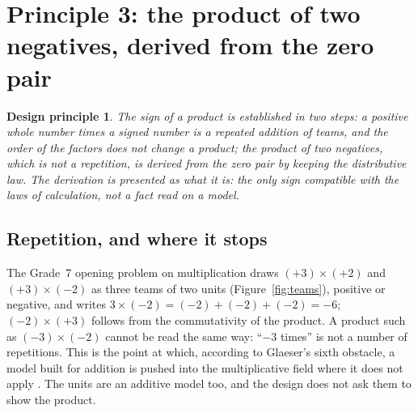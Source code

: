\documentclass[11pt,a4paper]{article}
\newtheorem{principle}{Design principle}
\theoremstyle{definition}
\begin{document}
\section{Principle 3: the product of two negatives, derived from the zero pair}\label{sec:p3}

\begin{principle}
The sign of a product is established in two steps: a positive whole number times a signed number is a repeated addition of teams, and the order of the factors does not change a product; the product of two negatives, which is not a repetition, is derived from the zero pair by keeping the distributive law. The derivation is presented as what it is: the only sign compatible with the laws of calculation, not a fact read on a model.
\end{principle}

\subsection{Repetition, and where it stops}
The Grade~7 opening problem on multiplication draws $(+3)\times(+2)$ and $(+3)\times(-2)$ as three teams of two units (Figure~\ref{fig:teams}), positive or negative, and writes $3\times(-2)=(-2)+(-2)+(-2)=-6$; $(-2)\times(+3)$ follows from the commutativity of the product. A product such as $(-3)\times(-2)$ cannot be read the same way: ``$-3$ times'' is not a number of repetitions. This is the point at which, according to Glaeser's sixth obstacle, a model built for addition is pushed into the multiplicative field where it does not apply \citep{Glaeser1981}. The units are an additive model too, and the design does not ask them to show the product.
\end{document}
